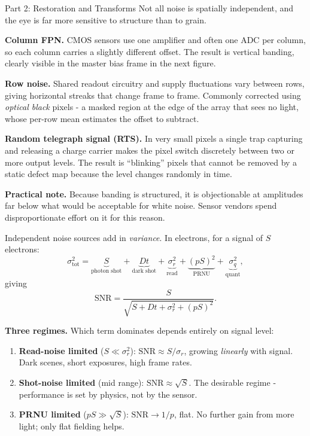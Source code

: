 \documentclass[letterpaper]{article}
\begin{document}
\begin{notes}{Part 2: Restoration and Transforms}
Not all noise is spatially independent, and the eye is far more sensitive to structure than to grain.

\textbf{Column FPN.} CMOS sensors use one amplifier and often one ADC per column, so each column carries a slightly different offset. The result is vertical banding, clearly visible in the master bias frame in the next figure.

\textbf{Row noise.} Shared readout circuitry and supply fluctuations vary between rows, giving horizontal streaks that change frame to frame. Commonly corrected using \emph{optical black} pixels - a masked region at the edge of the array that sees no light, whose per-row mean estimates the offset to subtract.

\textbf{Random telegraph signal (RTS).} In very small pixels a single trap capturing and releasing a charge carrier makes the pixel switch discretely between two or more output levels. The result is ``blinking'' pixels that cannot be removed by a static defect map because the level changes randomly in time.

\textbf{Practical note.} Because banding is structured, it is objectionable at amplitudes far below what would be acceptable for white noise. Sensor vendors spend disproportionate effort on it for this reason.


Independent noise sources add in \emph{variance}. In electrons, for a signal of $S$ electrons:
$$\sigma_{\text{tot}}^2 = \underbrace{S}_{\text{photon shot}} + \underbrace{D t}_{\text{dark shot}} + \underbrace{\sigma_r^2}_{\text{read}} + \underbrace{(pS)^2}_{\text{PRNU}} + \underbrace{\sigma_q^2}_{\text{quant}},$$
giving
$$\mathrm{SNR} = \frac{S}{\sqrt{S + Dt + \sigma_r^2 + (pS)^2}}.$$

\textbf{Three regimes.} Which term dominates depends entirely on signal level:
\begin{enumerate}
    \item \textbf{Read-noise limited} ($S \ll \sigma_r^2$): $\mathrm{SNR}\approx S/\sigma_r$, growing \emph{linearly} with signal. Dark scenes, short exposures, high frame rates.
    \item \textbf{Shot-noise limited} (mid range): $\mathrm{SNR}\approx\sqrt S$. The desirable regime - performance is set by physics, not by the sensor.
    \item \textbf{PRNU limited} ($pS \gg \sqrt S$): $\mathrm{SNR}\to 1/p$, flat. No further gain from more light; only flat fielding helps.
\end{enumerate}


\end{notes}
\end{document}
